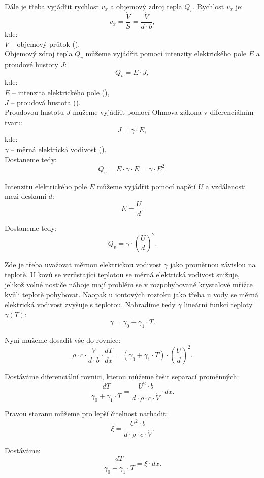 \documentclass{article}
\begin{document}
Dále je třeba vyjádřit rychlost $v_x$ a objemový zdroj tepla $Q_v$. Rychlost $v_x$ je:
$$
    v_x = \frac{\dot{V}}{S} = \frac{\dot{V}}{d \cdot b},
$$
kde:\\
$\dot{V}$ -- objemový průtok (\ueqMcuSinv).\\

Objemový zdroj tepla $Q_v$ můžeme vyjádřit pomocí intenzity elektrického pole $E$ a proudové hustoty $J$:
$$
    Q_v = E \cdot J,
$$
kde:\\
$E$ -- intenzita elektrického pole (\ueqVandMinv),\\
$J$ -- proudová hustota (\ueqAandMinvsq).\\

Proudovou hustotu $J$ můžeme vyjádřit pomocí Ohmova zákona v diferenciálním tvaru:
$$
    J = \gamma \cdot E,
$$
kde:\\
$\gamma$ -- měrná elektrická vodivost (\ueqOHMandMinv).\\

Dostaneme tedy:
$$
    Q_v = E \cdot \gamma \cdot E = \gamma \cdot E^2.
$$

Intenzitu elektrického pole $E$ můžeme vyjádřit pomocí napětí $U$ a vzdálenosti mezi deskami $d$:
$$
    E = \frac{U}{d}.
$$

Dostaneme tedy:
$$
    Q_v = \gamma \cdot \left( \frac{U}{d} \right)^2.
$$

Zde je třeba uvažovat měrnou elektrickou vodivost $\gamma$ jako proměrnou závislou na teplotě. U kovů se vzrůstající teplotou se měrná elektrická vodivost snižuje, jelikož volné nostiče náboje mají problém se v rozpohybované krystalové mřížce kvůli teplotě pohybovat. Naopak u iontových roztoku jako třeba u vody se měrná elektrická vodivost zvyšuje s teplotou. Nahradíme tedy $\gamma$ lineární funkcí teploty $\gamma(T)$:
$$
    \gamma = \gamma_0 + \gamma_1 \cdot T.
$$

Nyní můžeme dosadit vše do rovnice:
$$
    \rho \cdot c \cdot \frac{\dot{V}}{d \cdot b} \cdot \frac{dT}{dx} = \left( \gamma_0 + \gamma_1 \cdot T \right) \cdot \left( \frac{U}{d} \right)^2.
$$

Dostáváme diferenciální rovnici, kterou můžeme řešit separací proměnných:
$$
    \frac{dT}{\gamma_0 + \gamma_1 \cdot T} = \frac{U^2 \cdot b}{d \cdot \rho \cdot c \cdot \dot{V}} \cdot dx.
$$

Pravou staranu můžeme pro lepší čitelnost narhadit:
$$
    \xi = \frac{U^2 \cdot b}{d \cdot \rho \cdot c \cdot \dot{V}}.
$$

Dostáváme:
$$
    \frac{dT}{\gamma_0 + \gamma_1 \cdot T} = \xi \cdot dx.
$$
\end{document}
